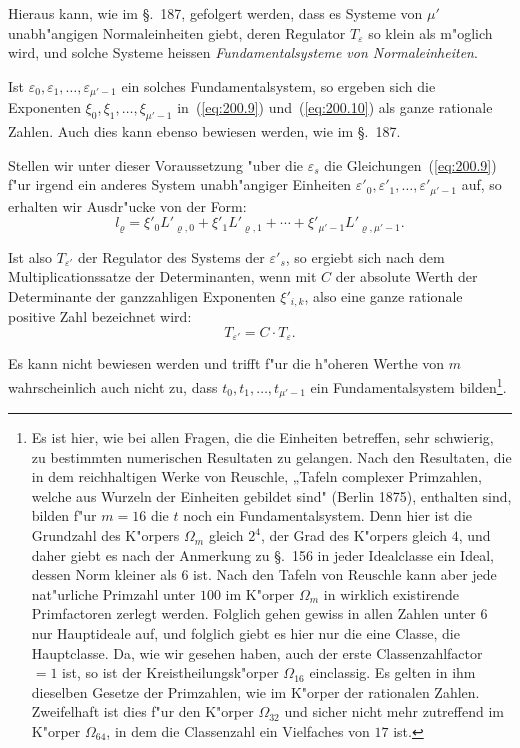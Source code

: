 \documentclass[10pt,a4paper]{article}
\theoremstyle{weberstyle}
\begin{document}
Hieraus kann, wie im \S.~187, gefolgert werden, dass es Systeme von
$\mu'$ unabh"angigen Normaleinheiten giebt, deren Regulator $T_\varepsilon$ so klein
als m"oglich wird, und solche Systeme heissen \emph{Fundamentalsysteme von
Normaleinheiten}.

Ist $\varepsilon_0,\varepsilon_1,\dots,\varepsilon_{\mu'-1}$ ein solches Fundamentalsystem,
so ergeben sich die Exponenten $\xi_0,\xi_1,\dots,\xi_{\mu'-1}$
in~(\ref{eq:200.9}) und~(\ref{eq:200.10}) als ganze rationale Zahlen. Auch dies
kann ebenso bewiesen werden, wie im \S.~187.

Stellen wir unter dieser Voraussetzung "uber die $\varepsilon_s$ die
Gleichungen~(\ref{eq:200.9}) f"ur irgend ein anderes System unabh"angiger
Einheiten $\varepsilon'_0,\varepsilon'_1,\dots,\varepsilon'_{\mu'-1}$ auf, so erhalten wir
Ausdr"ucke von der Form:
\[
l_\varrho = \xi'_0 L'_{\varrho,0} + \xi'_1 L'_{\varrho,1} + \cdots +
\xi'_{\mu'-1} L'_{\varrho,\mu'-1}.
\]

Ist also $T_{\varepsilon'}$ der Regulator des Systems der $\varepsilon'_s$, so ergiebt sich
nach dem Multiplicationssatze der Determinanten, wenn mit $C$ der absolute
Werth der Determinante der ganzzahligen Exponenten $\xi'_{i,k}$, also eine
ganze rationale positive Zahl bezeichnet wird:
\begin{equation}\label{eq:200.11}
T_{\varepsilon'} = C\cdot T_\varepsilon.
\end{equation}

Es kann nicht bewiesen werden und trifft f"ur die h"oheren Werthe von $m$
wahrscheinlich auch nicht zu, dass $t_0,t_1,\dots,t_{\mu'-1}$ ein
Fundamentalsystem bilden\footnote{Es ist hier, wie bei allen Fragen, die
die Einheiten betreffen, sehr schwierig, zu bestimmten numerischen
Resultaten zu gelangen. Nach den Resultaten, die in dem reichhaltigen Werke
von Reuschle, „Tafeln complexer Primzahlen, welche aus Wurzeln der Einheiten
gebildet sind" (Berlin 1875), enthalten sind, bilden f"ur $m=16$ die $t$
noch ein Fundamentalsystem. Denn hier ist die Grundzahl des K"orpers
$\Omega_m$ gleich $2^4$, der Grad des K"orpers gleich $4$, und daher giebt es
nach der Anmerkung zu \S.~156 in jeder Idealclasse ein Ideal, dessen Norm
kleiner als $6$ ist. Nach den Tafeln von Reuschle kann aber jede nat"urliche
Primzahl unter $100$ im K"orper $\Omega_m$ in wirklich existirende Primfactoren
zerlegt werden. Folglich gehen gewiss in allen Zahlen unter $6$ nur
Hauptideale auf, und folglich giebt es hier nur die eine Classe, die
Hauptclasse. Da, wie wir gesehen haben, auch der erste Classenzahlfactor $=1$
ist, so ist der Kreistheilungsk"orper $\Omega_{16}$ einclassig. Es gelten in ihm
dieselben Gesetze der Primzahlen, wie im K"orper der rationalen Zahlen.
Zweifelhaft ist dies f"ur den K"orper $\Omega_{32}$ und sicher nicht mehr
zutreffend im K"orper $\Omega_{64}$, in dem die Classenzahl ein Vielfaches von
$17$ ist.}.
\end{document}
